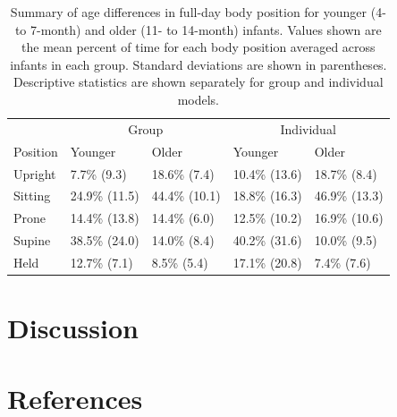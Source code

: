 \documentclass[
  man]{apa6}
\begin{document}
\begin{table}[tbp]

\begin{center}
\begin{threeparttable}

\caption{\label{tab:agetable}Summary of age differences in full-day body position for younger (4- to 7-month) and older (11- to 14-month) infants. Values shown are the mean percent of time for each body position averaged across infants in each group. Standard deviations are shown in parentheses. Descriptive statistics are shown separately for group and individual models.}

\begin{tabular}{lllll}
\toprule
 & \multicolumn{2}{c}{Group} & \multicolumn{2}{c}{Individual} \\
\cmidrule(r){2-3} \cmidrule(r){4-5}
Position & Younger & Older & Younger & Older\\
\midrule
Upright & 7.7\% (9.3) & 18.6\% (7.4) & 10.4\% (13.6) & 18.7\% (8.4)\\
Sitting & 24.9\% (11.5) & 44.4\% (10.1) & 18.8\% (16.3) & 46.9\% (13.3)\\
Prone & 14.4\% (13.8) & 14.4\% (6.0) & 12.5\% (10.2) & 16.9\% (10.6)\\
Supine & 38.5\% (24.0) & 14.0\% (8.4) & 40.2\% (31.6) & 10.0\% (9.5)\\
Held & 12.7\% (7.1) & 8.5\% (5.4) & 17.1\% (20.8) & 7.4\% (7.6)\\
\bottomrule
\end{tabular}

\end{threeparttable}
\end{center}

\end{table}

\hypertarget{discussion}{%
\section{Discussion}\label{discussion}}

\newpage

\hypertarget{references}{%
\section{References}\label{references}}
\end{document}
